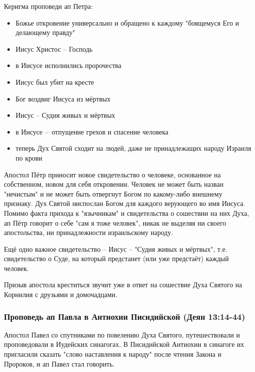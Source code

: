 Керигма проповеди ап Петра:
\begin{itemize}
	\item Божье откровение универсально и обращено к каждому "боящемуся Его и делающему правду"
	\item Иисус Христос – Господь
	\item в Иисусе исполнились пророчества
	\item Иисус был убит на кресте
	\item Бог воздвиг Иисуса из мёртвых
	\item Иисус – Судия живых и мёртвых
	\item в Иисусе – отпущение грехов и спасение человека
	\item теперь Дух Святой сходит на людей, даже не принадлежащих народу Израиля по крови
\end{itemize}

Апостол Пётр приносит новое свидетельство о человеке, основанное на собственном, новом для себя откровении.
Человек не может быть назван "нечистым" и не может быть отвергнут Богом по какому-либо внешнему признаку.
Дух Святой ниспослан Богом для каждого верующего во имя Иисуса.
Помимо факта прихода к "язычникам" и свидетельства о сошествии на них Духа, ап Пётр говорит о себе "сам я тоже человек", никак не выделяя ни своего апостольства, ни принадлежности израильскому народу.

Ещё одно важное свидетельство – Иисус – "Судия живых и мёртвых", т.е. свидетельство о Суде, на который предстанет (или уже предстаёт) каждый человек.

Призыв апостола креститься звучит уже в ответ на сошествие Духа Святого на Корнилия с друзьями и домочадцами.

\subsubsection*{Проповедь ап Павла в Антиохии Писидийской (Деян 13:14-44)}
Апостол Павел со спутниками по повелению Духа Святого, путешествовали и проповедовали в Иудейских синагогах.
В Писидийской Антиохии в синагоге их пригласили сказать "слово наставления к народу" после чтения Закона и Пророков, и ап Павел стал говорить.

